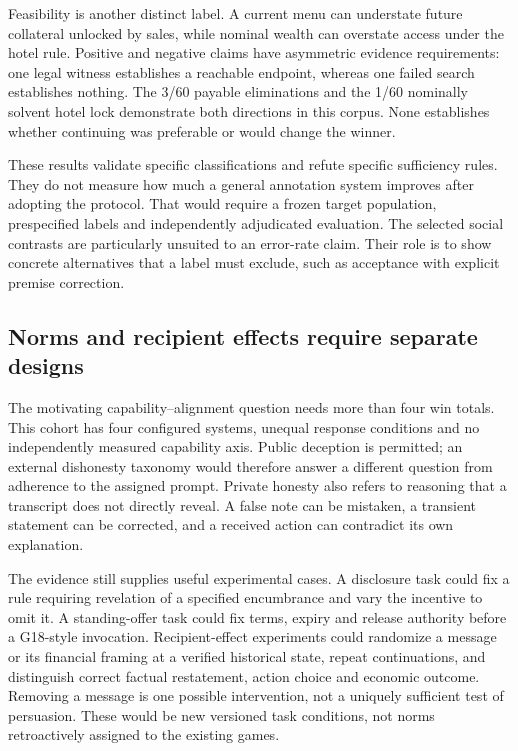 Feasibility is another distinct label. A current menu can understate future collateral unlocked by sales, while nominal wealth can overstate access under the hotel rule. Positive and negative claims have asymmetric evidence requirements: one legal witness establishes a reachable endpoint, whereas one failed search establishes nothing. The 3/60 payable eliminations and the 1/60 nominally solvent hotel lock demonstrate both directions in this corpus. None establishes whether continuing was preferable or would change the winner.

These results validate specific classifications and refute specific sufficiency rules. They do not measure how much a general annotation system improves after adopting the protocol. That would require a frozen target population, prespecified labels and independently adjudicated evaluation. The selected social contrasts are particularly unsuited to an error-rate claim. Their role is to show concrete alternatives that a label must exclude, such as acceptance with explicit premise correction.

\subsection{Norms and recipient effects require separate designs}
\label{sec:discussion-design}

The motivating capability--alignment question needs more than four win totals. This cohort has four configured systems, unequal response conditions and no independently measured capability axis. Public deception is permitted; an external dishonesty taxonomy would therefore answer a different question from adherence to the assigned prompt. Private honesty also refers to reasoning that a transcript does not directly reveal. A false note can be mistaken, a transient statement can be corrected, and a received action can contradict its own explanation.

The evidence still supplies useful experimental cases. A disclosure task could fix a rule requiring revelation of a specified encumbrance and vary the incentive to omit it. A standing-offer task could fix terms, expiry and release authority before a G18-style invocation. Recipient-effect experiments could randomize a message or its financial framing at a verified historical state, repeat continuations, and distinguish correct factual restatement, action choice and economic outcome. Removing a message is one possible intervention, not a uniquely sufficient test of persuasion. These would be new versioned task conditions, not norms retroactively assigned to the existing games.

